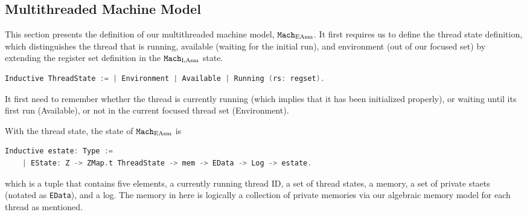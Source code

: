 \subsection{Multithreaded Machine Model}
\label{chapter:linking:subsec:multithreaded-machine-model}

This section presents the definition of our multithreaded machine model,
${\mathrm{\texttt{Mach}}}_{\mathrm{EAsm}}$.
It first requires us to define the thread state definition, which distinguishes
the thread that is running, available (waiting  for the initial run), 
and environment (out of our focused set) by extending the register set definition in the ${\mathrm{\texttt{Mach}}}_{\mathrm{LAsm}}$ state.
\begin{lstlisting}[language=C]
Inductive ThreadState := | Environment | Available | Running (rs: regset).
\end{lstlisting}
It first need to remember whether the thread is currently running (which implies that it has been initialized properly),
or waiting until its first run (Available), or not in the current focused thread set (Environment).

With the thread state,  the state of ${\mathrm{\texttt{Mach}}}_{\mathrm{EAsm}}$ is
\begin{lstlisting}[language=C]
  Inductive estate: Type :=
    | EState: Z -> ZMap.t ThreadState -> mem -> EData -> Log -> estate.
\end{lstlisting}
which is a tuple that contains five elements,
a currently running thread ID, a set of thread states, a memory, a set of private staets (notated as \lstinline$EData$), and a log. 
The memory in here is logically a collection of private memories via our algebraic memory model for each thread as mentioned. 

